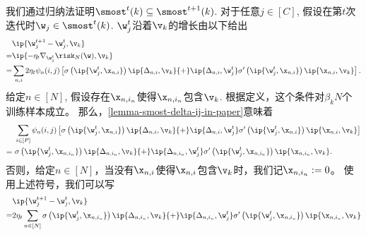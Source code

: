 \begin{myproof}
我们通过归纳法证明$\smost^{t}(k) \subseteq \smost^{t+1}(k)$. 
对于任意$j \in [C]$, 假设在第$t$次迭代时$\w_j \in \smost^{t}(k)$. 
$\w_{j}^{t}$沿着$\v_k$的增长由以下给出
\begin{equation}\label{eq-theorem-phase-I-main-wjt+1-wjt}
\begin{aligned}
    & \ip{\w^{t+1}_j - \w^{t}_j,\v_k} \\
    = & \ip{ - \eta_t \nabla_{\w_j^{t}} \risk_N (\w) , \v_k}  \\
    = & \sum_{n,i} 2 \eta_t \psi_n(i,j) \left[ \sigma\left(\ip{\w_j^{t},\x_{n,i}}   \right) \ip{\Delta_{n,i},\v_k} 
    {+} \ip{\Delta_{n,i}, \w_j^{t}} \sigma^{\prime}\left(\ip{\w_j^{t},\x_{n,i}}  \right) \ip{\x_{n,i},\v_k} \right].
\end{aligned}
\end{equation}
给定$n \in [N]$, 假设存在$\x_{n,i_n}$使得$\x_{n,i_n}$包含$\v_k$.
根据定义，这个条件对$\beta_k N$个训练样本成立。
那么，\cref{lemma-smost-delta-ij-in-paper}意味着
\begin{equation}\label{eq-theorem-phase-I-main-xni-contains-vk}
\begin{aligned}
    &\sum_{i \in [P]} \psi_n(i,j) \left[ \sigma\left(\ip{\w_j^{t},\x_{n,i}}   \right) \ip{\Delta_{n,i},\v_k} 
    {+} \ip{\Delta_{n,i}, \w_j^{t}} \sigma^{\prime}\left(\ip{\w_j^{t},\x_{n,i}}  \right) \ip{\x_{n,i},\v_k} \right] \\
    = \ & \sigma\left(\ip{\w_j^{t},\x_{n,i_n}}   \right) \ip{\Delta_{n,i_n},\v_k} 
    {+} \ip{\Delta_{n,i_n}, \w_j^{t}} \sigma^{\prime}\left(\ip{\w_j^{t},\x_{n,i_n}}  \right) \ip{\x_{n,i_n},\v_k}.
\end{aligned}
\end{equation}
否则，给定$n \in [N]$，当没有$\x_{n,i}$使得$\x_{n,i}$包含$\v_k$时，我们记$\x_{n,i_n} := 0$。
使用上述符号，我们可以写
\begin{equation}\label{eq-theorem-phase-I-main-smost-combine}
    \begin{aligned}
    & \ip{\w^{t+1}_j - \w^{t}_j,\v_k} \\
    = & 2 \eta_t \sum_{n \in [N]} \sigma\left(\ip{\w_j^{t},\x_{n,i_n}}   \right) \ip{\Delta_{n,i_n},\v_k} 
    {+} \ip{\Delta_{n,i_n}, \w_j^{t}} \sigma^{\prime}\left(\ip{\w_j^{t},\x_{n,i_n}}  \right) \ip{\x_{n,i_n},\v_k} 
    \end{aligned}
\end{equation}


\end{myproof}
